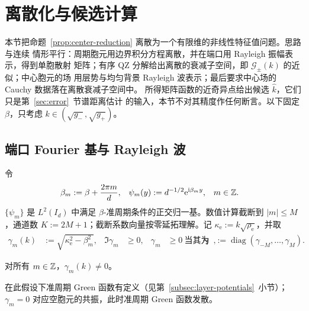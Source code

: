 \section{离散化与候选计算}
\label{sec:discretization}

本节把命题~\ref{prop:center-reduction} 离散为一个有限维的非线性特征值问题。思路与连续
情形平行：周期胞元用边界积分方程离散，并在端口用 Rayleigh 振幅表示，得到单胞散射
矩阵；有序 QZ 分解给出离散的衰减子空间，即 $\mathcal G_\pm(k)$ 的近似；中心胞元的场
用层势与均匀背景 Rayleigh 波表示；最后要求中心场的 Cauchy 数据落在离散衰减子空间中。
所得矩阵函数的近奇异点给出候选 $\widehat k$，它们只是第~\ref{sec:error}~节谱距离估计
的输入，本节不对其精度作任何断言。以下固定 $\beta$，只考虑
$k\in(\sqrt{g_-},\sqrt{g_+})$。

\subsection{端口 Fourier 基与 Rayleigh 波}
\label{subsec:rayleigh}

令
\begin{align}
  \beta_m&:=\beta+\frac{2\pi m}{d},
  &\psi_m(y)&:=d^{-1/2}\mathrm{e}^{\mathrm{i}\beta_my},
  &m&\in\mathbb{Z}.
  \label{eq:port-fourier-basis}
\end{align}
$\{\psi_m\}$ 是 $L^2(I_d)$ 中满足 $\beta$-准周期条件的正交归一基。数值计算截断到
$|m|\leq M$，通道数 $K:=2M+1$；截断系数向量按零延拓理解。记
$\kappa_{\mathrm e}:=k\sqrt{\rho_{\mathrm e}}$，并取
\begin{align}
  \gamma_m(k)&:=\sqrt{\kappa_{\mathrm e}^2-\beta_m^2},
  &\Im\gamma_m&\geq0,
  &\gamma_m&\geq0\ \text{当其为实数时},
  &\boldsymbol\gamma&:=\operatorname{diag}(\gamma_{-M},\ldots,\gamma_M).
  \label{eq:rayleigh-gamma}
\end{align}

\begin{assumption}[非 Wood 异常]
  \label{ass:no-wood}
  对所有 $m\in\mathbb{Z}$，$\gamma_m(k)\ne0$。
\end{assumption}

在此假设下准周期 Green 函数有定义（见第~\ref{subsec:layer-potentials}~小节）；
$\gamma_m=0$ 对应空胞元的共振，此时准周期 Green 函数发散\cite{BarnettGreengard2010}。

